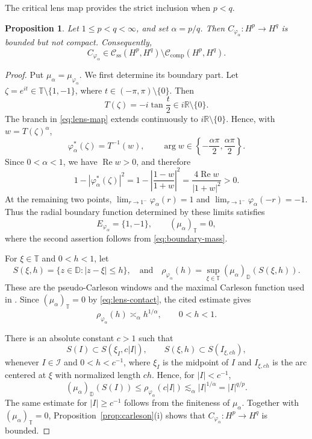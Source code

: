 \documentclass[10pt,a4paper]{amsart}
\newtheorem{proposition}[theorem]{Proposition}
\newcommand{\D}{\mathbb{D}}
\newcommand{\T}{\mathbb{T}}
\newcommand{\CK}{\mathcal C_{\mathrm{comp}}}
\newcommand{\CS}{\mathcal C_{\mathrm{ss}}}
\begin{document}
The critical lens map provides the strict inclusion when \(p<q\).

\begin{proposition}
\label{prop:lens-example}
Let \(1\le p<q<\infty\), and set \(\alpha=p/q\). Then
\(C_{\varphi_\alpha}:H^p\to H^q\) is bounded but not compact.
Consequently,
\[
        C_{\varphi_\alpha}
        \in
        \CS(H^p,H^q)\setminus\CK(H^p,H^q).
\]
\end{proposition}

\begin{proof}
Put \(\mu_\alpha=\mu_{\varphi_\alpha}\). We first determine its
boundary part. Let \(\zeta=e^{it}\in\T\setminus\{1,-1\}\), where
\(t\in(-\pi,\pi)\setminus\{0\}\). Then
\[
        T(\zeta)
        =
        -i\tan\frac{t}{2}
        \in i\mathbb R\setminus\{0\}.
\]
The branch in \eqref{eq:lens-map} extends continuously to
\(i\mathbb R\setminus\{0\}\). Hence, with \(w=T(\zeta)^\alpha\),
\[
        \varphi_\alpha^*(\zeta)=T^{-1}(w),
        \qquad
        \arg w\in
        \left\{-\frac{\alpha\pi}{2},\frac{\alpha\pi}{2}\right\}.
\]
Since \(0<\alpha<1\), we have \(\operatorname{Re}w>0\), and therefore
\[
        1-\left|\varphi_\alpha^*(\zeta)\right|^2
        =
        1-\left|\frac{1-w}{1+w}\right|^2
        =
        \frac{4\operatorname{Re}w}{|1+w|^2}
        >0.
\]
At the remaining two points,
\(\lim_{r\to1^-}\varphi_\alpha(r)=1\) and
\(\lim_{r\to1^-}\varphi_\alpha(-r)=-1\). Thus the radial boundary
function determined by these limits satisfies
\begin{equation}
\label{eq:lens-contact}
        E_{\varphi_\alpha}=\{1,-1\},
        \qquad
        (\mu_\alpha)_\T=0,
\end{equation}
where the second assertion follows from
\eqref{eq:boundary-mass}.

For \(\xi\in\T\) and \(0<h<1\), let
\[
        S(\xi,h)=\{z\in\D:|z-\xi|\le h\},
        \quad\text{and}\quad
        \rho_{\varphi_\alpha}(h)
        =
        \sup_{\xi\in\T}(\mu_\alpha)_\D(S(\xi,h)).
\]
These are the pseudo-Carleson windows and the maximal Carleson
function used in
\cite[(3.1), Lemma~3.3]{LefevreLiQueffelecRodriguezPiazza2013Lens}.
Since \((\mu_\alpha)_\T=0\) by
\eqref{eq:lens-contact}, the cited estimate gives
\[
        \rho_{\varphi_\alpha}(h)
        \asymp_\alpha
        h^{1/\alpha},
        \qquad
        0<h<1.
\]

There is an absolute constant \(c>1\) such that
\begin{equation}
\label{eq:box-window}
        S(I)\subset S(\xi_I,c|I|),
        \qquad
        S(\xi,h)\subset S(I_{\xi,ch}),
\end{equation}
whenever \(I\in\mathcal I\) and \(0<h<c^{-1}\), where \(\xi_I\) is
the midpoint of \(I\) and \(I_{\xi,ch}\) is the arc centered at
\(\xi\) with normalized length \(ch\). Hence, for \(|I|<c^{-1}\),
\[
        (\mu_\alpha)_\D(S(I))
        \le
        \rho_{\varphi_\alpha}(c|I|)
        \lesssim_\alpha
        |I|^{1/\alpha}
        =
        |I|^{q/p}.
\]
The same estimate for \(|I|\ge c^{-1}\) follows from the finiteness of
\(\mu_\alpha\). Together with \((\mu_\alpha)_\T=0\),
Proposition~\ref{prop:carleson}\textup{(i)} shows that
\(C_{\varphi_\alpha}:H^p\to H^q\) is bounded.


\end{proof}
\end{document}
